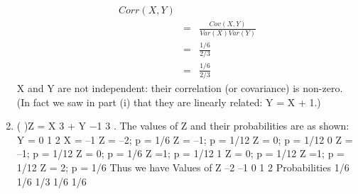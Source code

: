\documentclass[a4paper,12pt]{article}
\begin{document}
\begin{enumerate}
\begin{eqnarray*}Corr(X, Y) \\ &=& \frac{Cov(X, Y)}{Var(X ) Var(Y  )}
\\ &=& \frac{1/6}{2/3} \\ &=& \frac{1/6}{2/3}
\end{eqnarray*}
X and Y are not independent: their correlation (or covariance) is non-zero. (In fact we
saw in part (i) that they are linearly related: Y = X + 1.)
\item ( )Z = X 3 + Y −1 3 . The values of Z and their probabilities are as shown:
Y = 0 1 2
X = –1 Z = –2; p = 1/6 Z = –1; p = 1/12 Z = 0; p = 1/12
0 Z = –1; p = 1/12 Z = 0; p = 1/6 Z =1; p = 1/12
1 Z = 0; p = 1/12 Z =1; p = 1/12 Z = 2; p = 1/6
Thus we have
Values of Z –2 –1 0 1 2
Probabilities 1/6 1/6 1/3 1/6 1/6
\end{enumerate}
\end{document}
